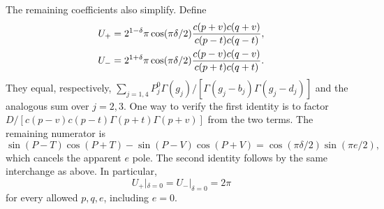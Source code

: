 The remaining coefficients also simplify. Define
\begin{align}
 U_+&=2^{1-\delta}\pi\cos(\pi\delta/2)
           \frac{c(p+v)c(q+v)}{c(p-t)c(q-t)},\notag\\
 U_-&=2^{1+\delta}\pi\cos(\pi\delta/2)
           \frac{c(p-v)c(q-v)}{c(p+t)c(q+t)}.
 \label{eq:assembly-U}
\end{align}
They equal, respectively,
$\sum_{j=1,4}P_j^0\Gamma(g_j)/[\Gamma(g_j-b_j)\Gamma(g_j-d_j)]$
and the analogous sum over $j=2,3$. One way to verify the first identity
is to factor
$D/[c(p-v)c(p-t)\Gamma(p+t)\Gamma(p+v)]$ from the two terms.
The remaining numerator is
\[
 \sin(P-T)\cos(P+T)-\sin(P-V)\cos(P+V)
 =\cos(\pi\delta/2)\sin(\pi e/2),
\]
which cancels the apparent $e$ pole. The second identity follows by the
same interchange as above. In particular,
\begin{equation}
 U_+|_{\delta=0}=U_-|_{\delta=0}=2\pi
 \label{eq:assembly-residue}
\end{equation}
for every allowed $p,q,e$, including $e=0$.

